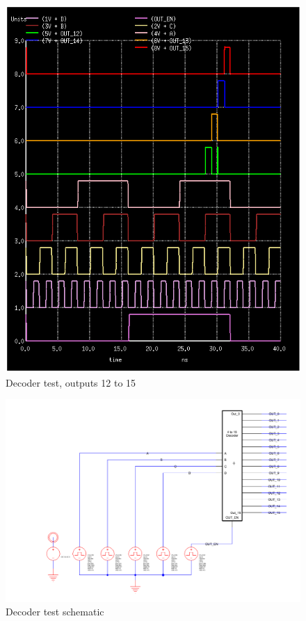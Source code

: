 \documentclass[12pt]{report}
\begin{document}
\begin{figure}[H]
  \centering
    \includegraphics[width=1.0\textwidth]{decoder_test_12_to_15.PNG}
  \caption{Decoder test, outputs 12 to 15}
  \label{fig:decoder_test_12_to_15}
\end{figure}
\begin{figure}[H]
  \centering
    \includegraphics[width=1.0\textwidth]{TestSchematics/decoder.PNG}
  \caption{Decoder test schematic}
\end{figure}
\end{document}
